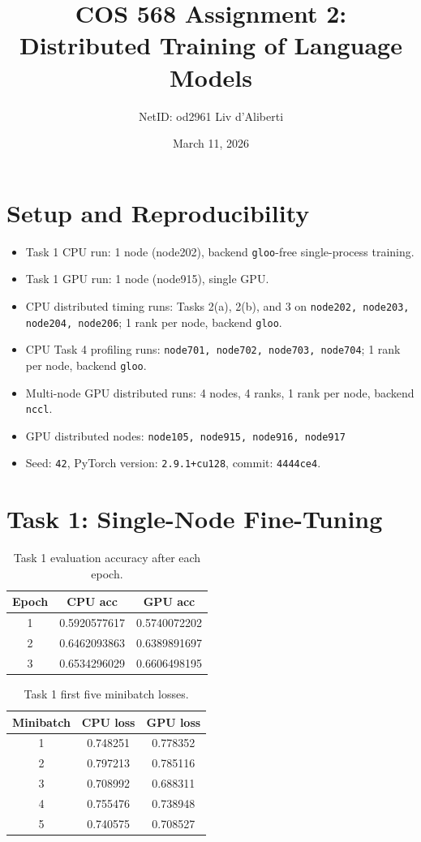 \documentclass[11pt]{article}
\title{COS 568 Assignment 2: Distributed Training of Language Models}
\author{NetID: od2961 \quad Liv d'Aliberti}
\date{March 11, 2026}
\begin{document}
\maketitle

\section{Setup and Reproducibility}
\begin{itemize}
\item Task 1 CPU run: 1 node (node202), backend \texttt{gloo}-free single-process training.
\item Task 1 GPU run: 1 node (node915), single GPU.
\item CPU distributed timing runs: Tasks 2(a), 2(b), and 3 on \texttt{node202, node203, node204, node206}; 1 rank per node, backend \texttt{gloo}.
\item CPU Task 4 profiling runs: \texttt{node701, node702, node703, node704}; 1 rank per node, backend \texttt{gloo}.
\item Multi-node GPU distributed runs: 4 nodes, 4 ranks, 1 rank per node, backend \texttt{nccl}.
\item GPU distributed nodes: \texttt{node105, node915, node916, node917}
\item Seed: \texttt{42}, PyTorch version: \texttt{2.9.1+cu128}, commit: \texttt{4444ce4}.
\end{itemize}

\section{Task 1: Single-Node Fine-Tuning}
\begin{table}[H]
\centering
\begin{tabular}{ccc}
\toprule
Epoch & CPU acc & GPU acc \\
\midrule
1 & 0.5920577617 & 0.5740072202 \\
2 & 0.6462093863 & 0.6389891697 \\
3 & 0.6534296029 & 0.6606498195 \\
\bottomrule
\end{tabular}
\caption{Task 1 evaluation accuracy after each epoch.}
\end{table}

\begin{table}[H]
\centering
\begin{tabular}{ccc}
\toprule
Minibatch & CPU loss & GPU loss \\
\midrule
1 & 0.748251 & 0.778352 \\
2 & 0.797213 & 0.785116 \\
3 & 0.708992 & 0.688311 \\
4 & 0.755476 & 0.738948 \\
5 & 0.740575 & 0.708527 \\
\bottomrule
\end{tabular}
\caption{Task 1 first five minibatch losses.}
\end{table}
\end{document}
